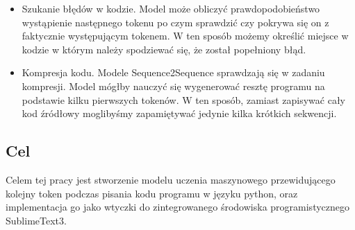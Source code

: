 \begin{description}
\begin{itemize}
	\item Szukanie błędów w kodzie. Model może obliczyć prawdopodobieństwo wystąpienie następnego tokenu po czym sprawdzić czy 
	pokrywa się on z faktycznie występującym tokenem. W ten sposób możemy określić miejsce w kodzie w którym należy 
	spodziewać się, że został popełniony błąd. 

	\item Kompresja kodu. Modele Sequence2Sequence sprawdzają się w zadaniu kompresji. Model mógłby nauczyć się wygenerować resztę programu 
	na podstawie kilku pierwszych tokenów. W ten sposób, zamiast zapisywać cały kod źródłowy moglibyśmy zapamiętywać jedynie kilka 
	krótkich sekwencji. 
\end{itemize}
\end{description}



\subsection {Cel}
Celem tej pracy jest stworzenie modelu uczenia maszynowego przewidującego kolejny token podczas pisania kodu programu w języku python, 
oraz implementacja go jako wtyczki do zintegrowanego środowiska programistycznego SublimeText3. 
